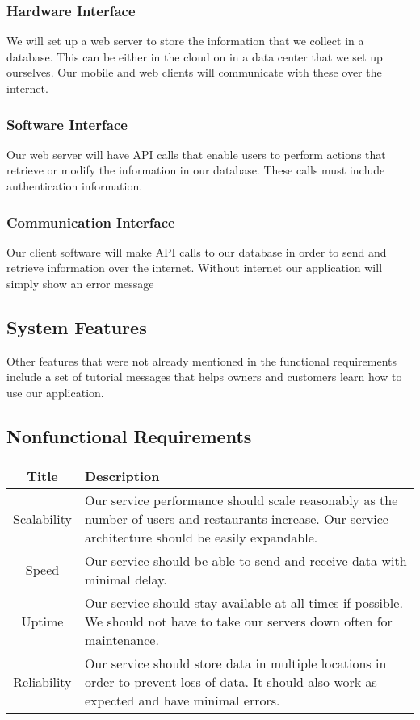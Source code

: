 \documentclass[12pt]{article}
\begin{document}
\subsubsection{Hardware Interface}

We will set up a web server to store the information that we collect in a database. This can be either in the cloud on in
a data center that we set up ourselves. Our mobile and web clients will communicate with these over the internet.

\subsubsection{Software Interface}

Our web server will have API calls that enable users to perform actions that retrieve or modify the information in our database.
These calls must include authentication information.

\subsubsection{Communication Interface}

Our client software will make API calls to our database in order to send and retrieve information over the internet. Without
internet our application will simply show an error message

\subsection{System Features}

Other features that were not already mentioned in the functional requirements include a set of tutorial messages that
helps owners and customers learn how to use our application.

\subsection{Nonfunctional Requirements}

\begin{center}
    \begin{tabularx}{\linewidth}{c|X}
        Title & Description\\
        \hline
        \hline
        Scalability & Our service performance should scale reasonably as the number of users and restaurants increase. Our service architecture should be easily expandable.\\
        \hline
        Speed & Our service should be able to send and receive data with minimal delay.\\
        \hline
        Uptime & Our service should stay available at all times if possible. We should not have to take our servers down often for maintenance.\\
        \hline
        Reliability & Our service should store data in multiple locations in order to prevent loss of data. It should also work as expected and have minimal errors.
    \end{tabularx}
\end{center}
\end{document}
